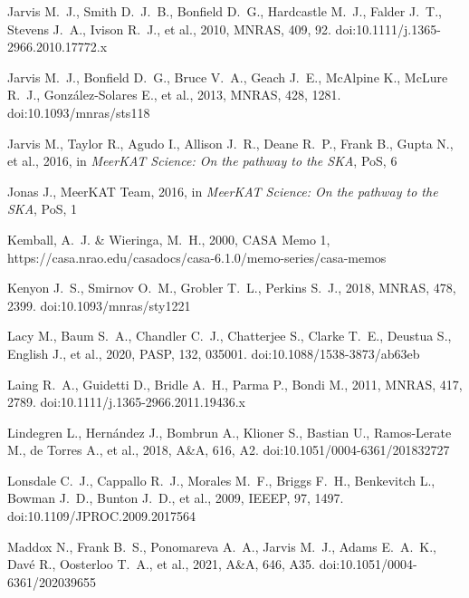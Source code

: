 \documentclass[usenatbib,usedcolumn]{mnras}
\begin{document}
\begin{thebibliography}{}
 Jarvis M.~J., Smith D.~J.~B., Bonfield D.~G., Hardcastle M.~J., Falder J.~T., Stevens J.~A., Ivison R.~J., et al., 2010, MNRAS, 409, 92. doi:10.1111/j.1365-2966.2010.17772.x

 Jarvis M.~J., Bonfield D.~G., Bruce V.~A., Geach J.~E., McAlpine K., McLure R.~J., Gonz{\'a}lez-Solares E., et al., 2013, MNRAS, 428, 1281. doi:10.1093/mnras/sts118

 Jarvis M., Taylor R., Agudo I., Allison J.~R., Deane R.~P., Frank B., Gupta N., et al., 2016, in \emph{MeerKAT Science: On the pathway to the SKA}, PoS, 6

 Jonas J., MeerKAT Team, 2016, in \emph{MeerKAT Science: On the pathway to the SKA}, PoS, 1

 Kemball, A.~J. \& Wieringa, M.~H., 2000, CASA Memo 1, https://casa.nrao.edu/casadocs/casa-6.1.0/memo-series/casa-memos

 Kenyon J.~S., Smirnov O.~M., Grobler T.~L., Perkins S.~J., 2018, MNRAS, 478, 2399. doi:10.1093/mnras/sty1221

 Lacy M., Baum S.~A., Chandler C.~J., Chatterjee S., Clarke T.~E., Deustua S., English J., et al., 2020, PASP, 132, 035001. doi:10.1088/1538-3873/ab63eb

 Laing R.~A., Guidetti D., Bridle A.~H., Parma P., Bondi M., 2011, MNRAS, 417, 2789. doi:10.1111/j.1365-2966.2011.19436.x

 Lindegren L., Hern{\'a}ndez J., Bombrun A., Klioner S., Bastian U., Ramos-Lerate M., de Torres A., et al., 2018, A\&A, 616, A2. doi:10.1051/0004-6361/201832727

 Lonsdale C.~J., Cappallo R.~J., Morales M.~F., Briggs F.~H., Benkevitch L., Bowman J.~D., Bunton J.~D., et al., 2009, IEEEP, 97, 1497. doi:10.1109/JPROC.2009.2017564

 Maddox N., Frank B.~S., Ponomareva A.~A., Jarvis M.~J., Adams E.~A.~K., Dav{\'e} R., Oosterloo T.~A., et al., 2021, A\&A, 646, A35. doi:10.1051/0004-6361/202039655


\end{thebibliography}
\end{document}

